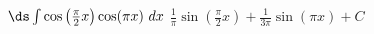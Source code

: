 {$\ds \int \cos\left(\frac{\pi}{2} x\right)\cos(\pi x)\ dx$}
{$\frac{1}{\pi}\sin(\frac{\pi}{2} x)+\frac{1}{3\pi}\sin(\pi x)+ C$}
